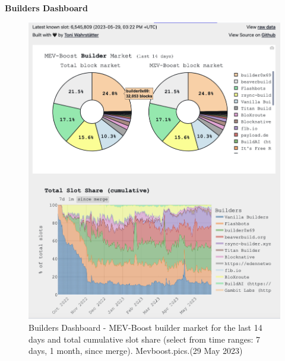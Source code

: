 \documentclass[UTF8]{article}
\begin{document}
{\clearpage
\textbf{Builders Dashboard} 
\begin{figure}[htbp]
\begin{center}
\includegraphics[width=0.85\linewidth]{images/mevbuilder1}
\caption{Builders Dashboard - MEV-Boost builder market for the last 14 days  and total cumulative slot share (select from time ranges: 7 days, 1 month, since merge). Mevboost.pics.(29 May 2023)}
\label{fig:mevbuilder1}
\end{center}
\end{figure}

}
\end{document}
